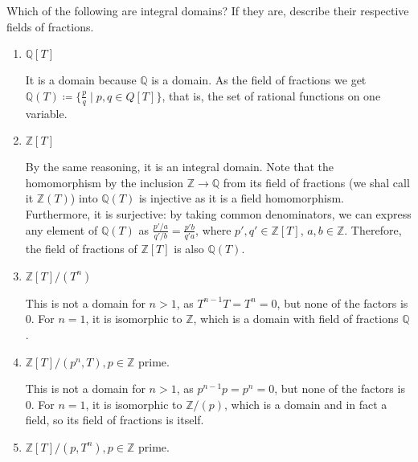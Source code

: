 \begin{problem}
    Which of the following are integral domains?
    If they are, describe their respective fields of fractions.
    
    \begin{enumerate}
        \item $\mathbb{Q}[T]$
        \begin{sol}
            It is a domain because $\mathbb{Q}$ is a domain.
            As the field of fractions we get $\mathbb{Q}(T) \coloneqq
            \{\frac{p}{q} \mid p, q \in Q[T]\}$, that is, the set of
            rational functions on one variable.
        \end{sol}
        \item $\mathbb{Z}[T]$
        \begin{sol}
            By the same reasoning, it is an integral domain.
            Note that the homomorphism by the inclusion $\mathbb{Z} \rightarrow \mathbb{Q}$
            from its field of fractions (we shal call it $\mathbb{Z}(T)$)
            into $\mathbb{Q}(T)$ is injective as it is a field homomorphism.
            Furthermore, it is surjective: by taking common denominators, we can express
            any element of $\mathbb{Q}(T)$ as $\frac{p'/a}{q'/b} = \frac{p'b}{q'a}$,
            where $p', q' \in \mathbb{Z}[T]$, $a, b \in \mathbb{Z}$.
            Therefore, the field of fractions of $\mathbb{Z}[T]$ is also $\mathbb{Q}(T)$.
        \end{sol}
        \item $\mathbb{Z}[T]/(T^n)$
        \begin{sol}
            This is not a domain for $n > 1$, as $T^{n-1}T = T^n = 0$,
            but none of the factors is $0$.
            For $n = 1$, it is isomorphic to $\mathbb{Z}$, which is a domain
            with field of fractions $\mathbb{Q}$.
        \end{sol}
        \item  $\mathbb{Z}[T]/(p^n, T), p \in \mathbb{Z}$ prime.
        \begin{sol}
            This is not a domain for $n > 1$, as $p^{n-1}p = p^n = 0$,
            but none of the factors is $0$.
            For $n = 1$, it is isomorphic to $\mathbb{Z}/(p)$, which is a domain
            and in fact a field, so its field of fractions is itself.
        \end{sol}
        \item $\mathbb{Z}[T]/(p, T^n), p \in \mathbb{Z}$ prime.
        \begin{sol}

\end{sol}
\end{enumerate}
\end{problem}
